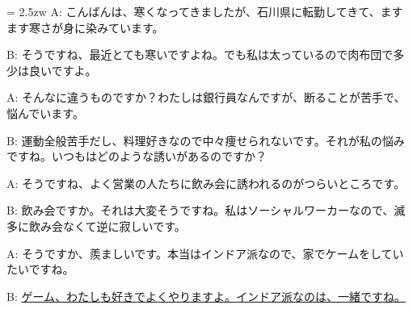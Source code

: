 \documentclass[11pt]{amsart}
\title{}
\author{}
\newenvironment{hangall}[1]{\hangindent = 2.5zw\everypar{\hangindent = 2.5zw}}{}
\begin{document}
\maketitle
\begin{hangall}{}%
A: こんばんは、寒くなってきましたが、石川県に転勤してきて、ますます寒さが身に染みています。

B: そうですね、最近とても寒いですよね。でも私は太っているので肉布団で多少は良いですよ。

A: そんなに違うものですか？わたしは銀行員なんですが、断ることが苦手で、悩んでいます。

B: 運動全般苦手だし、料理好きなので中々痩せられないです。それが私の悩みですね。いつもはどのような誘いがあるのですか？

A: そうですね、よく営業の人たちに飲み会に誘われるのがつらいところです。

B: 飲み会ですか。それは大変そうですね。私はソーシャルワーカーなので、滅多に飲み会なくて逆に寂しいです。

A: そうですか、羨ましいです。本当はインドア派なので、家でケームをしていたいですね。

B: \ul{ゲーム、わたしも好きでよくやりますよ。インドア派なのは、一緒ですね。}\end{hangall}
\end{document}
